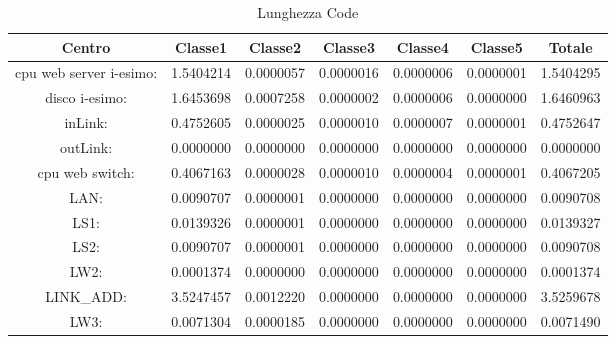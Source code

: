 \begin{table}[H]
\begin{center}\begin{scriptsize}
\begin{tabular}{||c|c|c|c|c|c|c||}
\hline
Centro &Classe1 &Classe2 &Classe3 &Classe4 &Classe5 &Totale\\
\hline
\hline
 cpu web server i-esimo: 	&1.5404214	&0.0000057	&0.0000016	&0.0000006	&0.0000001	&1.5404295\\
\hline
 disco i-esimo: 	&1.6453698	&0.0007258	&0.0000002	&0.0000006	&0.0000000	&1.6460963\\
\hline
 inLink: 	&0.4752605	&0.0000025	&0.0000010	&0.0000007	&0.0000001	&0.4752647\\
\hline
 outLink: 	&0.0000000	&0.0000000	&0.0000000	&0.0000000	&0.0000000	&0.0000000\\
\hline
 cpu web switch: 	&0.4067163	&0.0000028	&0.0000010	&0.0000004	&0.0000001	&0.4067205\\
\hline
 LAN: 	&0.0090707	&0.0000001	&0.0000000	&0.0000000	&0.0000000	&0.0090708\\
\hline
 LS1: 	&0.0139326	&0.0000001	&0.0000000	&0.0000000	&0.0000000	&0.0139327\\
\hline
 LS2: 	&0.0090707	&0.0000001	&0.0000000	&0.0000000	&0.0000000	&0.0090708\\
\hline
 LW2: 	&0.0001374	&0.0000000	&0.0000000	&0.0000000	&0.0000000	&0.0001374\\
\hline
 LINK\_ADD: 	&3.5247457	&0.0012220	&0.0000000	&0.0000000	&0.0000000	&3.5259678\\
\hline
 LW3: 	&0.0071304	&0.0000185	&0.0000000	&0.0000000	&0.0000000	&0.0071490\\
\hline
\end{tabular}
\end{scriptsize}\end{center}
\caption{Lunghezza Code}
\label{lunghezzacode}
\end{table}

